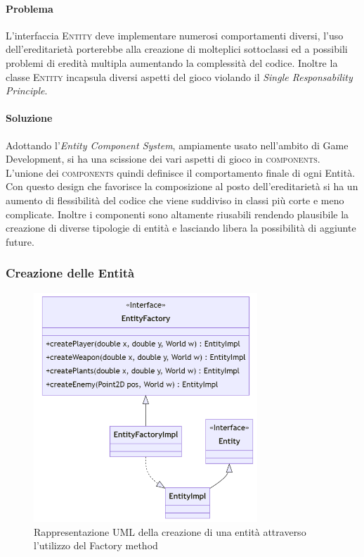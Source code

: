 \documentclass[a4paper,12pt]{report}
\begin{document}
\paragraph{Problema}
    L'interfaccia \textsc{Entity} deve implementare numerosi comportamenti diversi, l'uso dell'ereditarietà porterebbe alla creazione di molteplici sottoclassi ed a possibili problemi di eredità multipla aumentando la complessità del codice. Inoltre la classe \textsc{Entity} incapsula diversi aspetti del gioco violando il \textit{Single Responsability Principle}.

\paragraph{Soluzione}
    Adottando l'\textit{Entity Component System}, ampiamente usato nell'ambito di Game Development, si ha una scissione dei vari aspetti di gioco in \textsc{components}. L'unione dei \textsc{components} quindi definisce il comportamento finale di ogni Entità. Con questo design che favorisce la composizione al posto dell'ereditarietà si ha un aumento di flessibilità del codice che viene suddiviso in classi più corte e meno complicate. Inoltre i componenti sono altamente riusabili rendendo plausibile la creazione di diverse tipologie di entità e lasciando libera la possibilità di aggiunte future.

\subsubsection{Creazione delle Entità}

\begin{figure}[H]
\centering{}
\includegraphics[width=0.75\textwidth,keepaspectratio]{img/EntityFactoryUML.png}
\caption{Rappresentazione UML della creazione di una entità attraverso l'utilizzo del Factory method}
\end{figure}
\end{document}
